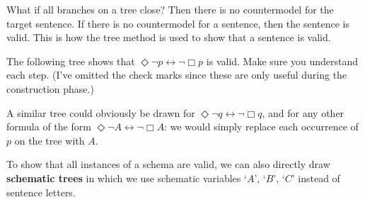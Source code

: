 What if all branches on a tree close? Then there is no countermodel for the
target sentence. If there is no countermodel for a sentence, then the sentence
is valid. This is how the tree method is used to show that a sentence is valid.

The following tree shows that
$\Diamond \neg p \leftrightarrow \neg \Box p$ is valid. Make sure you understand
each step. (I've omitted the check marks since these are only useful during the
construction phase.)

\begin{center}
\end{center}

A similar tree could obviously be drawn for
$\Diamond \neg q \leftrightarrow \neg \Box q$, and for any other formula of the
form $\Diamond \neg A \leftrightarrow \neg \Box A$: we would simply replace each
occurrence of $p$ on the tree with $A$.

To show that all instances of a schema are valid, we can also directly draw
\textbf{schematic trees} in which we use schematic variables `$A$', `$B$', `$C$'
instead of sentence letters.

